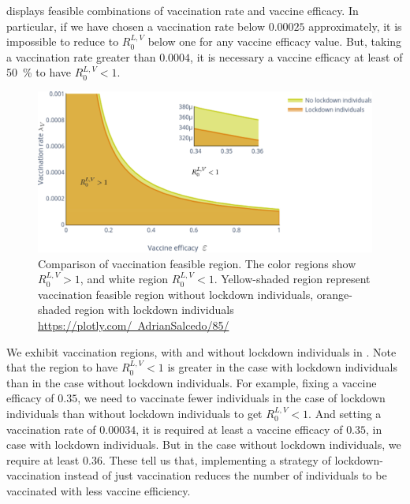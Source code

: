  displays feasible combinations of vaccination rate and
vaccine
efficacy. In particular,  if we have chosen a vaccination rate below
$\num{0.00025}$
approximately, it is impossible to reduce to $R^{L,V}_0$ below one for any
vaccine
efficacy value. But, taking a vaccination rate greater than $\num{0.0004}$,
it is necessary a vaccine efficacy at least of \SI{50}{\percent} to have
$R^{L,V}_0 < 1$.
%
\begin{figure}[tbh]
    \centering
    \includegraphics[scale=0.8,
    keepaspectratio]{./Figures/Rlv-feasible-region.pdf}
    \caption{
        Comparison of vaccination feasible region. The color regions show
        $R_0^{L,V}>1$, and white region $R_0^{L,V}<1$. Yellow-shaded region
        represent vaccination feasible region without lockdown individuals,
        orange-shaded region with lockdown individuals
        \href{https://plotly.com/~AdrianSalcedo/85/}{%
            https://plotly.com/~AdrianSalcedo/85/}
    }
    \label{fig:FeasibleRegion}
\end{figure}
%
    We exhibit vaccination regions, with and without lockdown individuals in
. Note that the region to have $R^{L,V}_0<1$ is
greater in the case with lockdown individuals than in the case without lockdown
individuals. For example, fixing a vaccine efficacy of $\num{0.35}$, we need to
vaccinate fewer individuals in the case of lockdown individuals than without
lockdown individuals to get $R^{L,V}_0<1$. And setting a vaccination rate of
$\num{0.00034}$, it is required at least a vaccine efficacy of $\num{0.35}$, in
case with lockdown individuals. But in the case without lockdown individuals, we
require at least $\num{0.36}$. These tell us that, implementing a strategy of
lockdown-vaccination instead of just vaccination reduces the number of
individuals to be vaccinated with less vaccine efficiency.
